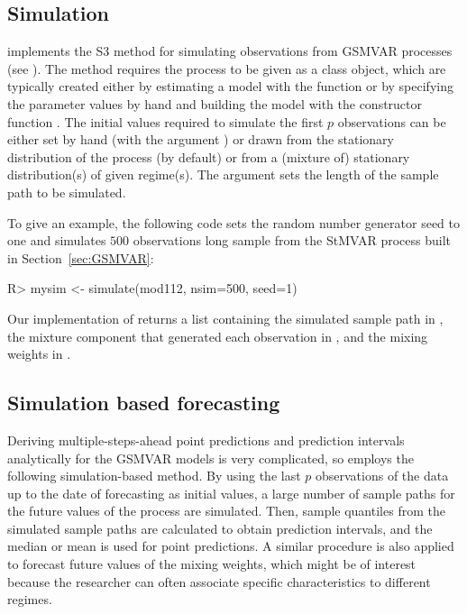 \documentclass[nojss]{jss}
\begin{document}
\subsection{Simulation}\label{sec:simu}
 implements the S3 method  for simulating observations from GSMVAR processes (see ). The method requires the process to be given as a class  object, which are typically created either by estimating a model with the function  or by specifying the parameter values by hand and building the model with the constructor function . The initial values required to simulate the first $p$ observations can be either set by hand (with the argument ) or drawn from the stationary distribution of the process (by default) or from a (mixture of) stationary distribution(s) of given regime(s). The argument  sets the length of the sample path to be simulated.

To give an example, the following code sets the random number generator seed to one and simulates $500$ observations long sample from the StMVAR process built in Section~\ref{sec:GSMVAR}:
%
\begin{CodeChunk}
\begin{CodeInput}
R> mysim <- simulate(mod112, nsim=500, seed=1)
\end{CodeInput}
\end{CodeChunk}
%
Our implementation of  returns a list containing the simulated sample path in , the mixture component that generated each observation in , and the mixing weights in .

\subsection{Simulation based forecasting}
Deriving multiple-steps-ahead point predictions and prediction intervals analytically for the GSMVAR models is very complicated, so  employs the following simulation-based method. By using the last $p$ observations of the data up to the date of forecasting as initial values, a large number of sample paths for the future values of the process are simulated. Then, sample quantiles from the simulated sample paths are calculated to obtain prediction intervals, and the median or mean is used for point predictions. A similar procedure is also applied to forecast future values of the mixing weights, which might be of interest because the researcher can often associate specific characteristics to different regimes.
\end{document}
